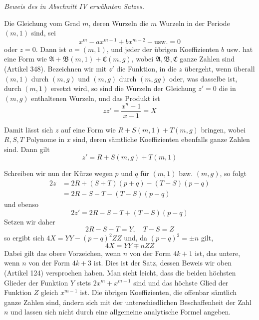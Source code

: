 \begin{center}\itshape \textit{Beweis des in Abschnitt IV erwähnten Satzes.}\end{center}


Die Gleichung vom Grad \(m\), deren Wurzeln die \(m\) Wurzeln in der Periode \((m,1)\) sind, sei \[x^m-ax^{m-1}+bx^{m-2}-\text{usw.}=0\] oder \(z=0\). Dann ist \(a=(m,1)\), und jeder der übrigen Koeffizienten \(b\) usw. hat eine Form wie \(\mathfrak A+\mathfrak B(m,1)+\mathfrak C(m,g)\), wobei \(\mathfrak A,\allowbreak \mathfrak B,\allowbreak \mathfrak C\) ganze Zahlen sind (Artikel 348). Bezeichnen wir mit \(z'\) die Funktion, in die \(z\) übergeht, wenn überall \((m,1)\) durch \((m,g)\) und \((m,g)\) durch \((m,gg)\) oder, was dasselbe ist, durch \((m,1)\) ersetzt wird, so sind die Wurzeln der Gleichung \(z'=0\) die in \((m,g)\) enthaltenen Wurzeln, und das Produkt ist \[zz'=\frac{x^n-1}{x-1}=X\]

Damit lässt sich \(z\) auf eine Form wie \(R+S(m,1)+T(m,g)\) bringen, wobei \(R,\allowbreak S,\allowbreak T\) Polynome in \(x\) sind, deren sämtliche Koeffizienten ebenfalls ganze Zahlen sind. Dann gilt \[z'=R+S(m,g)+T(m,1)\]

Schreiben wir nun der Kürze wegen \(p\) und \(q\) für \((m,1)\) bzw. \((m,g)\), so folgt \[\begin{aligned}2z&=2R+(S+T)(p+q)-(T-S)(p-q)\\&=2R-S-T-(T-S)(p-q)\end{aligned}\] und ebenso \[2z'=2R-S-T+(T-S)(p-q)\] Setzen wir daher \[2R-S-T=Y,\quad T-S=Z\]
so ergibt sich \(4X=YY-(p-q)^2ZZ\) und, da \((p-q)^2=\pm n\) gilt, \[4X=YY\mp nZZ\] Dabei gilt das obere Vorzeichen, wenn \(n\) von der Form \(4k+1\) ist, das untere, wenn \(n\) von der Form \(4k+3\) ist. Dies ist der Satz, dessen Beweis wir oben (Artikel 124) versprochen haben. Man sieht leicht, dass die beiden höchsten Glieder der Funktion \(Y\) stets \(2x^m+x^{m-1}\) sind und das höchste Glied der Funktion \(Z\) gleich \(x^{m-1}\) ist. Die übrigen Koeffizienten, die offenbar sämtlich ganze Zahlen sind, ändern sich mit der unterschiedlichen Beschaffenheit der Zahl \(n\) und lassen sich nicht durch eine allgemeine analytische Formel angeben.

